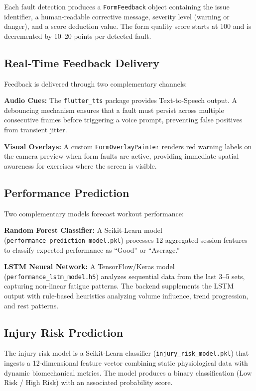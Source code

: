 \documentclass[conference]{IEEEtran}
\begin{document}
Each fault detection produces a \texttt{FormFeedback} object containing the issue identifier, a human-readable corrective message, severity level (warning or danger), and a score deduction value. The form quality score starts at 100 and is decremented by 10--20 points per detected fault.

\subsection{Real-Time Feedback Delivery}

Feedback is delivered through two complementary channels:

\textbf{Audio Cues:} The \texttt{flutter\_tts} package provides Text-to-Speech output. A debouncing mechanism ensures that a fault must persist across multiple consecutive frames before triggering a voice prompt, preventing false positives from transient jitter.

\textbf{Visual Overlays:} A custom \texttt{FormOverlayPainter} renders red warning labels on the camera preview when form faults are active, providing immediate spatial awareness for exercises where the screen is visible.

\subsection{Performance Prediction}

Two complementary models forecast workout performance:

\textbf{Random Forest Classifier:} A Scikit-Learn model (\texttt{performance\_prediction\_model.pkl}) processes 12 aggregated session features to classify expected performance as ``Good'' or ``Average.''

\textbf{LSTM Neural Network:} A TensorFlow/Keras model (\texttt{performance\_lstm\_model.h5}) analyzes sequential data from the last 3--5 sets, capturing non-linear fatigue patterns. The backend supplements the LSTM output with rule-based heuristics analyzing volume influence, trend progression, and rest patterns.

\subsection{Injury Risk Prediction}

The injury risk model is a Scikit-Learn classifier (\texttt{injury\_risk\_model.pkl}) that ingests a 12-dimensional feature vector combining static physiological data with dynamic biomechanical metrics. The model produces a binary classification (Low Risk / High Risk) with an associated probability score.
\end{document}
